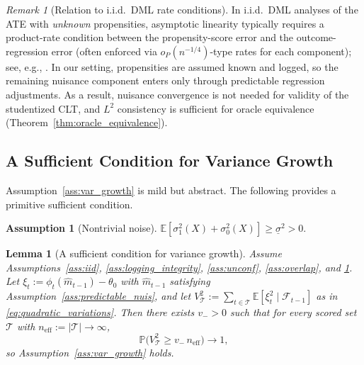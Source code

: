 \documentclass[11pt]{article}
\numberwithin{equation}{section}
\theoremstyle{plain}
\newtheorem{lemma}[theorem]{Lemma}
\theoremstyle{definition}
\newtheorem{assumption}[theorem]{Assumption}
\theoremstyle{remark}
\newtheorem{remark}[theorem]{Remark}
\newcommand{\E}{\mathbb{E}}
\newcommand{\Pp}{\mathbb{P}}
\newcommand{\cF}{\mathcal{F}}
\begin{document}
\begin{remark}[Relation to i.i.d.\ DML rate conditions]\label{rem:n14}
In i.i.d.\ DML analyses of the ATE with \emph{unknown} propensities, asymptotic linearity typically requires a product-rate condition between the propensity-score error and the outcome-regression error (often enforced via $o_P(n^{-1/4})$-type rates for each component); see, e.g., \citep{chernozhukov2018double,chernozhukov2022locally}.
In our setting, propensities are assumed known and logged, so the remaining nuisance component enters only through predictable regression adjustments.
As a result, nuisance convergence is not needed for validity of the studentized CLT, and $L^2$ consistency is sufficient for oracle equivalence (Theorem~\ref{thm:oracle_equivalence}).
\end{remark}

\subsection{A Sufficient Condition for Variance Growth}\label{sec:var_growth_sufficient}

Assumption~\ref{ass:var_growth} is mild but abstract. The following provides a primitive sufficient condition.

\begin{assumption}[Nontrivial noise]\label{ass:noise}
$\E[\sigma_1^2(X) + \sigma_0^2(X)] \ge \underline{\sigma}^2 > 0$.
\end{assumption}

\begin{lemma}[A sufficient condition for variance growth]\label{lem:var_growth_suff}
Assume Assumptions~\ref{ass:iid}, \ref{ass:logging_integrity}, \ref{ass:unconf}, \ref{ass:overlap}, and \ref{ass:noise}. Let $\xi_t:=\phi_t(\widehat m_{t-1})-\theta_0$ with $\widehat m_{t-1}$ satisfying Assumption~\ref{ass:predictable_nuis}, and let $V_{\mathcal{T}}^2:=\sum_{t\in\mathcal{T}}\E[\xi_t^2\mid \cF_{t-1}]$ as in \eqref{eq:quadratic_variations}. Then there exists $v_->0$ such that for every scored set $\mathcal{T}$ with $n_{\mathrm{eff}}:=|\mathcal{T}|\to\infty$,
\[
\Pp\!\big(V_{\mathcal{T}}^2 \ge v_-\, n_{\mathrm{eff}}\big)\to 1,
\]
so Assumption~\ref{ass:var_growth} holds.
\end{lemma}
\end{document}
